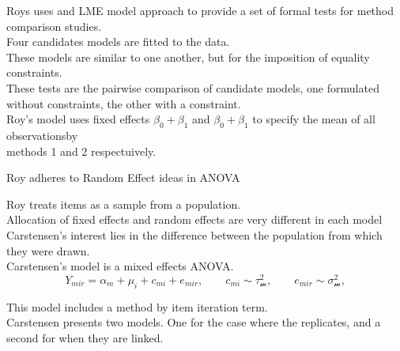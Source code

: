 \documentclass[12pt, a4paper]{report}
\theoremstyle{plain}
\theoremstyle{definition}
\theoremstyle{remark}
\begin{document}




Roys uses and LME model approach to provide a set of formal tests for method comparison studies.\\

Four candidates models are fitted to the data.\\

These models are similar to one another, but for the imposition of equality constraints.\\

These tests are the pairwise comparison of candidate models, one formulated without constraints, the other with a constraint.\\


Roy's model uses fixed effects $\beta_0 + \beta_1$ and $\beta_0 + \beta_1$ to specify the mean of all observationsby \\ methods 1 and 2 respectuively.





Roy adheres to Random Effect ideas in ANOVA

Roy treats items as a sample from a population.\\

Allocation of fixed effects and random effects are very different in each model\\

Carstensen's interest lies in the difference between the population from which they were drawn.\\

Carstensen's model is a mixed effects ANOVA.\\

\[
Y_{mir}  =  \alpha_m + \mu_i + c_{mi} + e_{mir}, \qquad c_{mi} \sim \mathcal{\tau^2_m}, \qquad e_{mir} \sim \mathcal{\sigma^2_m},
\]

This model includes a method by item iteration term.\\

Carstensen presents two models. One for the case where the replicates, and a second for when they are linked.\\
\end{document}
